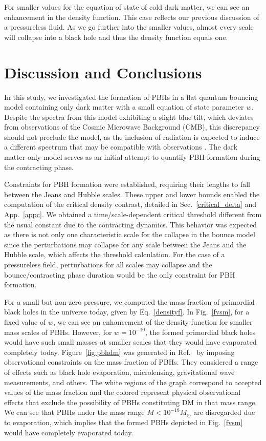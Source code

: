 \documentclass[a4paper,11pt]{article}
\begin{document}
For smaller values for the equation of state of cold dark matter, we can see an enhancement in the density function.  This case reflects our previous discussion of a pressureless fluid. As we go further into the smaller values, almost every scale will collapse into a black hole and thus the density function equals one.



\section{Discussion and Conclusions}
\label{sec:discussion}
In this study, we investigated the formation of PBHs in a flat quantum bouncing model containing only dark matter with a small equation of state parameter $w$. Despite the spectra from this model exhibiting a slight blue tilt, which deviates from observations of the Cosmic Microwave Background (CMB), this discrepancy should not preclude the model, as the inclusion of radiation is expected to induce a different spectrum that may be compatible with observations \cite{Vitenti2012}. The dark matter-only model serves as an initial attempt to quantify PBH formation during the contracting phase.

Constraints for PBH formation were established, requiring their lengths to fall between the Jeans and Hubble scales. These upper and lower bounds enabled the computation of the critical density contrast, detailed in Sec.~\ref{critical_delta} and App.~\ref{appc}. We obtained a time/scale-dependent critical threshold different from the usual constant due to the contracting dynamics. This behavior was expected as there is not only one characteristic scale for the collapse in the bounce model since the perturbations may collapse for any scale between the Jeans and the Hubble scale, which affects the threshold calculation. For the case of a pressureless field, perturbations for all scales may collapse and the bounce/contracting phase duration would be the only constraint for PBH formation.

For a small but non-zero pressure, we computed the mass fraction of primordial black holes in the universe today, given by Eq.~\eqref{densityf}. In Fig.~\ref{fvsm}, for a fixed value of $w$, we can see an enhancement of the density function for smaller mass scales of PBHs. However, for $w = 10^{-10}$, the formed primordial black holes would have such small masses at smaller scales that they would have evaporated completely today. Figure~\ref{fig:pbhdm} was generated in Ref.~\cite{Villanueva2021} by imposing observational constraints on the mass fraction of PBHs. They considered a range of effects such as black hole evaporation, microlensing, gravitational wave measurements, and others. The white regions of the graph correspond to accepted values of the mass fraction and the colored represent physical observational effects that exclude the possibility of PBHs constituting DM in that mass range. We can see that PBHs under the mass range $M <  10^{-18}M_\odot$ are disregarded due to evaporation, which implies that the formed PBHs depicted in Fig.~\ref{fvsm} would have completely evaporated today.
\end{document}
